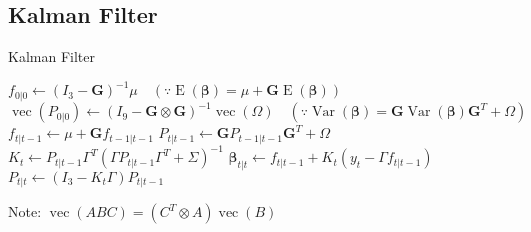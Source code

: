 \documentclass[11pt]{article}
\numberwithin{equation}{section} %
\numberwithin{figure}{section} %
\numberwithin{table}{section} %
\begin{document}
\subsection{Kalman Filter}
\begin{algorithm}[H]
  \caption{Kalman Filter}\label{Kalfilt}
  \begin{algorithmic}[1]
    	\State $f_{0|0}\gets  \left(I_{3}-\mathbf{G}\right)^{-1}\mu\quad \left(\because\operatorname{E}(\bm{\beta})=\mu+\mathbf{G}\operatorname{E}(\bm{\beta})\right)$
    	\State $\operatorname{vec}\left(P_{0|0}\right)\gets \left(I_{9}-\mathbf{G}\otimes \mathbf{G}\right)^{-1}\operatorname{vec}(\Omega)\quad  \left(\because\operatorname{Var}(\bm{\beta}) =  \mathbf{G}\operatorname{Var}(\bm{\beta})\mathbf{G}^{T}+\Omega\right)$
    	\State $f_{t|t-1}\gets \mu + \mathbf{G}f_{t-1|t-1}$
    	\State $P_{t|t-1}\gets \mathbf{G}P_{t-1|t-1}\mathbf{G}^{T}+\Omega$
    	\State $K_{t}\gets P_{t|t-1}\Gamma^{T}\left(\Gamma P_{t|t-1}\Gamma^{T}+\Sigma\right)^{-1}$
    	\State $\bm{\beta}_{t|t}\gets f_{t|t-1}+K_{t}\left(y_{t}-\Gamma f_{t|t-1}\right)$
    	\State $P_{t|t}\gets \left(I_{3}-K_{t}\Gamma\right)P_{t|t-1} $
    	\EndFor
    \EndProcedure
  \end{algorithmic}
\end{algorithm}
Note: $\operatorname{vec}(ABC)=\left(C^{T}\otimes A\right)\operatorname{vec}(B)$
\end{document}
